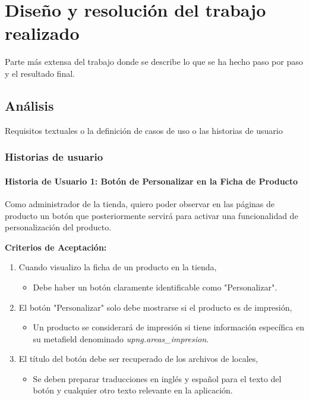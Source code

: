 \documentclass[12pt]{article}
\newcommand{\subsubsubsection}[1]{\paragraph{#1}}
\begin{document}
\section{Diseño y resolución del trabajo realizado}
Parte más extensa del trabajo donde se describe lo que se ha hecho paso por paso y el resultado final.

\subsection{Análisis}
Requisitos textuales o la definición de casos de uso o las historias de usuario

\subsubsection{Historias de usuario}

\subsubsubsection{Historia de Usuario 1: Botón de Personalizar en la Ficha de Producto}\label{sec:historia1}

Como administrador de la tienda, quiero poder observar en las páginas de producto un botón que posteriormente servirá para activar una funcionalidad de personalización del producto.

\vspace{0.5cm}
\textbf{Criterios de Aceptación:}
\begin{enumerate}[label=\arabic*.]
    \item Cuando visualizo la ficha de un producto en la tienda,
          \begin{itemize}[label=--]
              \item Debe haber un botón claramente identificable como "Personalizar".
          \end{itemize}
    \item El botón "Personalizar" solo debe mostrarse si el producto es de impresión,
          \begin{itemize}[label=--]
              \item Un producto se considerará de impresión si tiene información específica en su metafield denominado \textit{upng.areas\_impresion}.
          \end{itemize}
    \item El título del botón debe ser recuperado de los archivos de locales,
          \begin{itemize}[label=--]
              \item Se deben preparar traducciones en inglés y español para el texto del botón y cualquier otro texto relevante en la aplicación.
          \end{itemize}
\end{enumerate}
\end{document}
